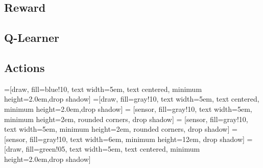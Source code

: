 \documentclass[]{beamer}
\begin{document}
	\subsection{Reward}

	\subsection{Q-Learner}

	\subsection{Actions}

\begin{frame}
\begin{center}

        =[draw, fill=blue!10, text width=5em,  text centered, minimum height=2.0em,drop shadow]
        =[draw, fill=gray!10, text width=5em,  text centered, minimum height=2.0em,drop shadow]
         = [sensor, fill=gray!10, text width=5em,  minimum height=2em, rounded corners, drop shadow]
         = [sensor, fill=gray!10, text width=5em,  minimum height=2em, rounded corners, drop shadow]
         = [sensor, fill=gray!10, text width=6em,  minimum height=12em, drop shadow]
         = [draw, fill=green!05, text width=5em,  text centered, minimum height=2.0em,drop shadow]

\end{center}
\end{frame}
\end{document}
